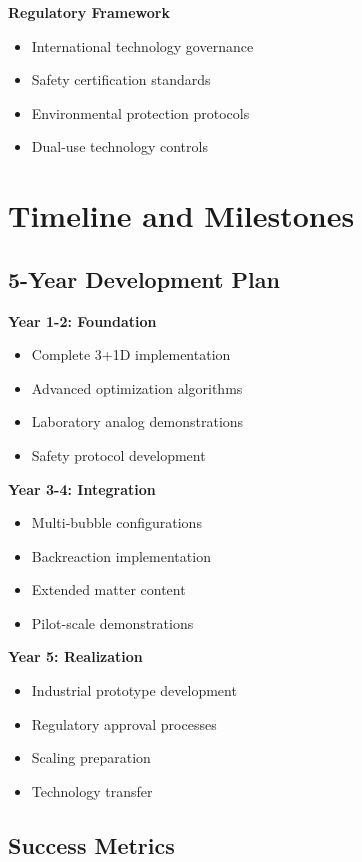 \documentclass[11pt]{article}
\begin{document}
\textbf{Regulatory Framework}
\begin{itemize}
\item International technology governance
\item Safety certification standards
\item Environmental protection protocols
\item Dual-use technology controls
\end{itemize}

\section{Timeline and Milestones}

\subsection{5-Year Development Plan}

\textbf{Year 1-2: Foundation}
\begin{itemize}
\item Complete 3+1D implementation
\item Advanced optimization algorithms
\item Laboratory analog demonstrations
\item Safety protocol development
\end{itemize}

\textbf{Year 3-4: Integration}
\begin{itemize}
\item Multi-bubble configurations
\item Backreaction implementation
\item Extended matter content
\item Pilot-scale demonstrations
\end{itemize}

\textbf{Year 5: Realization}
\begin{itemize}
\item Industrial prototype development
\item Regulatory approval processes
\item Scaling preparation
\item Technology transfer
\end{itemize}

\subsection{Success Metrics}
\end{document}
